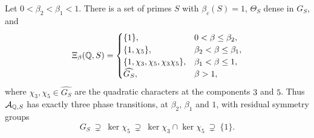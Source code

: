 \begin{proposition}\label{Main:prop:cascade}
Let $0<\beta_2<\beta_1<1$. There is a set of primes $S$ with $\beta_c(S)=1$,
$\Theta_S$ dense in $G_S$, and
\[
\Xi_\beta(\mathbb{Q},S)=\begin{cases}
\{1\},&0<\beta\le\beta_2,\\
\{1,\chi_5\},&\beta_2<\beta\le\beta_1,\\
\{1,\chi_3,\chi_5,\chi_3\chi_5\},&\beta_1<\beta\le1,\\
\widehat{G_S},&\beta>1,
\end{cases}
\]
where $\chi_3,\chi_5\in\widehat{G_S}$ are the quadratic characters at the
components $3$ and $5$. Thus $\mathcal{A}_{\mathbb{Q},S}$ has exactly three phase transitions,
at $\beta_2$, $\beta_1$ and $1$, with residual symmetry groups
\[
G_S\ \supsetneq\ \ker\chi_5\ \supsetneq\ \ker\chi_3\cap\ker\chi_5\ \supsetneq\ \{1\}.
\]
\end{proposition}

